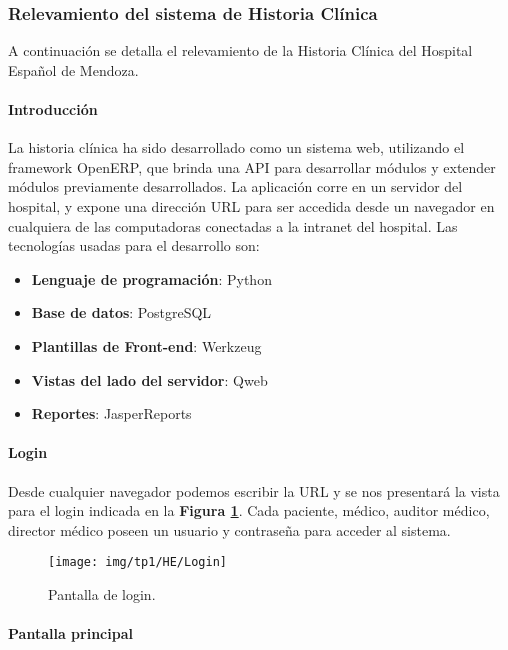 \subsubsection{Relevamiento del sistema de Historia Clínica}
A continuación se detalla el relevamiento de la Historia Clínica del Hospital Español de Mendoza.

\paragraph{Introducción}

La historia clínica ha sido desarrollado como un sistema web, utilizando el framework OpenERP, que brinda una API para desarrollar módulos y extender módulos previamente desarrollados.
La aplicación corre en un servidor del hospital, y expone una dirección URL para ser accedida desde un navegador en cualquiera de las computadoras conectadas a la intranet del hospital.
Las tecnologías usadas para el desarrollo son:

\begin{itemize}
    \item \textbf{Lenguaje de programación}: Python
    \item \textbf{Base de datos}: PostgreSQL
    \item \textbf{Plantillas de Front-end}: Werkzeug
    \item \textbf{Vistas del lado del servidor}: Qweb
    \item \textbf{Reportes}: JasperReports
\end{itemize}

\paragraph{Login}

Desde cualquier navegador podemos escribir la URL y se nos presentará la vista para el login indicada en la \textbf{Figura \ref{login-sistema}}.
Cada paciente, médico, auditor médico, director médico poseen un usuario y contraseña para acceder al sistema.

\begin{figure}[h]
      \centering
      \texttt{[image: img/tp1/HE/Login]}
      \caption{Pantalla de login.}
      \label{login-sistema}
\end{figure} 


\paragraph{Pantalla principal}

